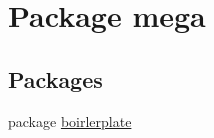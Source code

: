 \hypertarget{namespacemega}{}\section{Package mega}
\label{namespacemega}
\subsection*{Packages}
\begin{DoxyCompactItemize}
\item 
package \hyperlink{namespacemega_1_1boirlerplate}{boirlerplate}
\end{DoxyCompactItemize}
